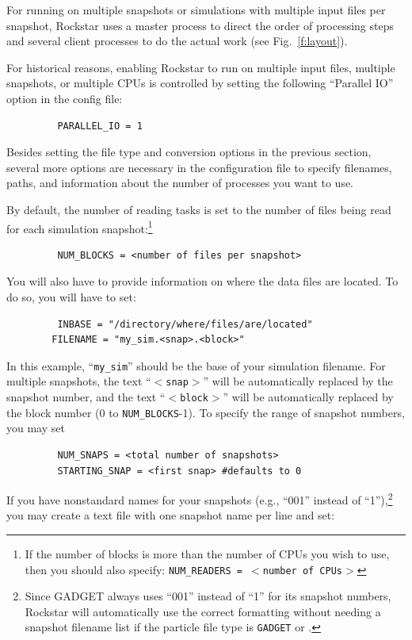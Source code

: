 \documentclass[12pt]{article}
\begin{document}
      For running on multiple snapshots or simulations with multiple input
      files per snapshot, Rockstar uses a master process to direct the
      order of processing steps and several client processes to do the
      actual work (see Fig.\ \ref{f:layout}).

      For historical reasons, enabling Rockstar to run on multiple input files,
      multiple snapshots, or multiple CPUs is controlled by setting the following ``Parallel
      IO'' option in the config file:
\begin{verbatim}
      	 PARALLEL_IO = 1
\end{verbatim}
      Besides setting the file type and conversion options in the previous section, 
      several more options are necessary in the configuration file to specify
      filenames, paths, and information about the number of processes you want
      to use.

      By default, the number of reading tasks is set to the number
      of files being read for each simulation snapshot:\footnote{If the number of blocks is more than the number of CPUs you wish to use, then you should also specify: \texttt{NUM\_READERS = $<$number of CPUs$>$}}
\begin{verbatim}
         NUM_BLOCKS = <number of files per snapshot>
\end{verbatim}
      You will also have to provide information on where the data files are
      located.  To do so, you will have to set:
\begin{verbatim}
      	 INBASE = "/directory/where/files/are/located"
        FILENAME = "my_sim.<snap>.<block>"
\end{verbatim}
      In this example, ``\texttt{my\_sim}'' should be the base of your simulation filename.
      For multiple snapshots, the text ``\texttt{$<$snap$>$}'' will be automatically replaced
      by the snapshot number, and the text ``\texttt{$<$block$>$}'' will be automatically
      replaced by the block number (0 to \texttt{NUM\_BLOCKS}-1).  To specify the range
      of snapshot numbers, you may set
\begin{verbatim}
         NUM_SNAPS = <total number of snapshots>
         STARTING_SNAP = <first snap> #defaults to 0
\end{verbatim}  
      If you have nonstandard names for your snapshots (e.g., ``001'' instead of
      ``1''),\footnote{Since GADGET always uses ``001'' instead of ``1'' for its snapshot numbers, Rockstar will automatically use the correct formatting without needing a snapshot filename list if the particle file type is \texttt{GADGET} or .} you may create a text file with one snapshot name per line and set:
\end{document}
